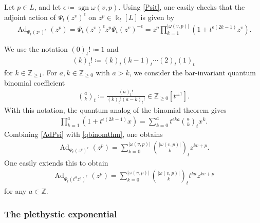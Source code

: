 \documentclass{amsart}
\DeclareMathOperator{\sign}{sgn}
\DeclareMathOperator{\Ad}{Ad}
\let\bb=\mathbb
\newcommand {\kk} {\Bbbk}
\theoremstyle{plain}%
\theoremstyle{definition}
\theoremstyle{remark}
\begin{document}
Let $p\in L$, and let $\epsilon\coloneqq \sign \omega(v,p)$.  Using \eqref{Psit}, one easily checks that the adjoint action of $\Psi_t(z^v)^{\epsilon}$ on $z^p\in \kk_t[L]$ is given by
\begin{align}\label{AdPsi}
\Ad_{\Psi_t(z^v)^{\epsilon}}(z^p)=\Psi_t(z^v)^{\epsilon}z^p \Psi_t(z^v)^{-\epsilon} = z^p \prod_{k=1}^{|\omega(v,p)|} (1+t^{\epsilon(2k-1)}z^{v}).
\end{align}

We use the notation $(0)_t!\coloneqq 1$ and
\begin{align*}
    (k)_t!\coloneqq (k)_t(k-1)_t\cdots(2)_t(1)_t
\end{align*}
for $k\in \bb{Z}_{\geq 1}$.  For $a,k\in \bb{Z}_{\geq 0}$ with $a>k$, we consider the bar-invariant quantum binomial coefficient
\begin{align}\label{qbinom}
    \binom{a}{k}_t\coloneqq \frac{(a)_t!}{(k)_t!(a-k)_t!} \in \bb{Z}_{\geq 0}[t^{\pm 1}].
\end{align}
With this notation, the quantum analog of the binomial theorem gives
\begin{align}\label{qbinomthm}
   \prod_{k=1}^{a} (1+t^{\epsilon(2k-1)}x)=\sum_{k=0}^a t^{\epsilon ka}\binom{a}{k}_t x^k.
\end{align}
Combining \eqref{AdPsi} with \eqref{qbinomthm}, one obtains
\begin{align*}
    \Ad_{\Psi_t(z^v)^{\epsilon}}(z^p) = \sum_{k=0}^{|\omega(v,p)|} \binom{|\omega(v,p)|}{k}_t z^{kv+p}.
\end{align*}
One easily extends this to obtain
\begin{align}\label{tAdBinomial}
    \Ad_{\Psi_t(t^{a}z^v)^{\epsilon}}(z^p) = \sum_{k=0}^{|\omega(v,p)|} \binom{|\omega(v,p)|}{k}_t t^{ka} z^{kv+p}
\end{align}
for any $a\in \bb{Z}$.


\subsubsection{The plethystic exponential}\label{Sec:plethystic}
\end{document}
